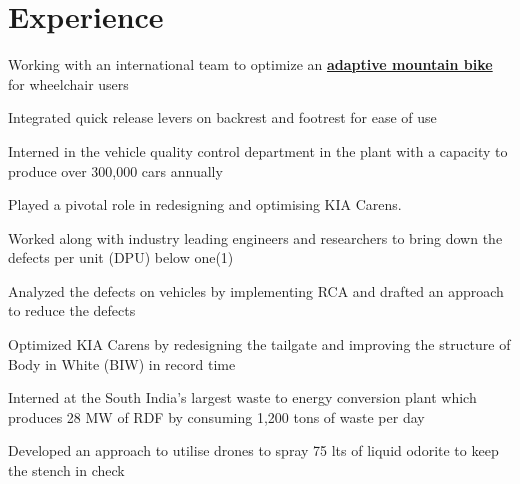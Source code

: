 \documentclass[]{deedy-resume-openfont}
\begin{document}
\begin{minipage}[t]{0.66\textwidth} 


\section{Experience}
\vspace{\topsep}
\begin{tightemize}
\item Working with an international team to optimize an \textbf{\href{https://github.com/abixxvii/MjolnirMTB}{adaptive mountain bike}} for wheelchair users
\item Integrated quick release levers on backrest and footrest for ease of use
\end{tightemize}

\sectionsep

\vspace{\topsep} %
\begin{tightemize}
\item Interned in the vehicle quality control department in the plant with a capacity to produce over 300,000 cars annually
\item Played a pivotal role in redesigning and optimising KIA Carens. 
\item Worked along with industry leading engineers and researchers to bring down the defects per unit (DPU) below one(1)
\item Analyzed the defects on vehicles by implementing RCA and drafted an approach to reduce the defects
\item Optimized KIA Carens by redesigning the tailgate and improving the structure of Body in White (BIW) in record time
\end{tightemize}
\sectionsep

\begin{tightemize}
\item Interned at the South India's largest waste to energy conversion plant which produces 28 MW of RDF by consuming 1,200 tons of waste per day
\item Developed an approach to utilise drones to spray 75 lts of liquid odorite to keep the stench in check
\end{tightemize}
\sectionsep


\end{minipage}
\end{document}
